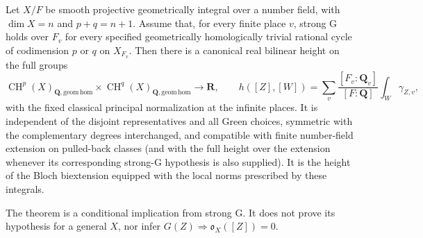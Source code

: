 \begin{theorem}
\label{r16ph:general-height}
Let $X/F$ be smooth projective geometrically integral over a
number field, with $\dim X=n$ and $p+q=n+1$.
Assume that, for every finite place $v$, strong G holds over
$F_v$ for every specified geometrically homologically trivial
rational cycle of codimension $p$ or $q$ on $X_{F_v}$.
Then there is a canonical real bilinear height on the full groups
\[
 \operatorname{CH}^p(X)_{\mathbf Q,\mathrm{geom\,hom}}
 \times\operatorname{CH}^q(X)_{\mathbf Q,\mathrm{geom\,hom}}
                         \longrightarrow\mathbf R,
 \qquad
 h([Z],[W])=\sum_v\frac{[F_v:\mathbf Q_v]}{[F:\mathbf Q]}
                         \int_W\gamma_{Z,v},
 \tag{PH16.10}\label{r16ph:general-height-formula}
\]
with the fixed classical principal normalization at the infinite
places.  It is independent of the disjoint representatives and
all Green choices, symmetric with the complementary degrees
interchanged, and compatible with finite number-field extension
on pulled-back classes (and with the full height over the extension
whenever its corresponding strong-G hypothesis is also supplied).
It is the height of the Bloch biextension equipped with the
local norms prescribed by these integrals.

The theorem is a conditional implication from strong G.  It does
not prove its hypothesis for a general $X$, nor infer
$G(Z)\Rightarrow\mathfrak o_X([Z])=0$.
\end{theorem}

